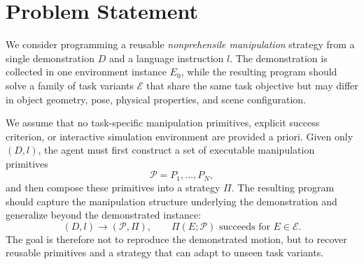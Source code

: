 \section{Problem Statement}
\label{sec:problem}

We consider programming a reusable \textit{nonprehensile manipulation} strategy from a single demonstration $D$ and a language instruction $l$. The demonstration is collected in one environment instance $E_0$, while the resulting program should solve a family of task variants $\mathcal{E}$ that share the same task objective but may differ in object geometry, pose, physical properties, and scene configuration.

We assume that no task-specific manipulation primitives, explicit success criterion, or interactive simulation environment are provided a priori. Given only $(D, l)$, the agent must first construct a set of executable manipulation primitives
\[
\mathcal{P} = {P_1,\ldots,P_N},
\]
and then compose these primitives into a strategy $\Pi$. The resulting program should capture the manipulation structure underlying the demonstration and generalize beyond the demonstrated instance:
\[
(D,l)
\longrightarrow
(\mathcal{P},\Pi),
\qquad
\Pi(E;\mathcal{P}) \text{ succeeds for } E \in \mathcal{E}.
\]
The goal is therefore not to reproduce the demonstrated motion, but to recover reusable primitives and a strategy that can adapt to unseen task variants.
